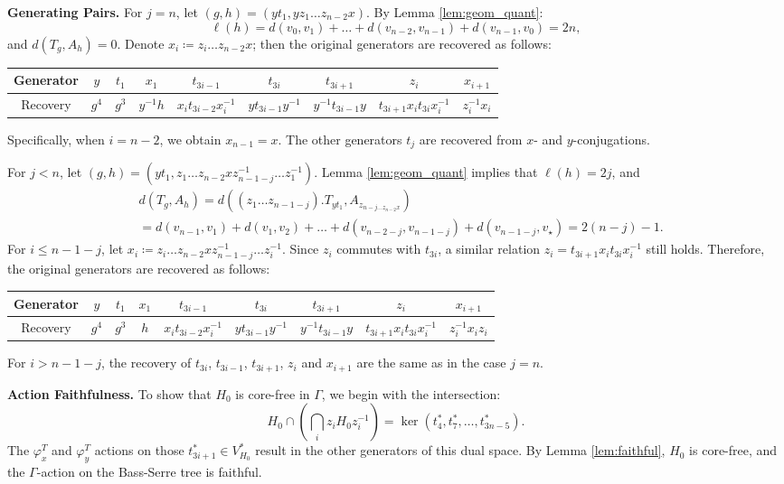 \documentclass[12pt,leqno]{amsart}
\makeatletter
\renewenvironment{proof}[1][\proofname]{%
	\par
	\pushQED{\qed}%
	\normalfont
	\topsep6\p@\@plus6\p@\relax
	\trivlist
	\item[\hskip\labelsep\itshape #1\@addpunct{.}]%
	\ignorespaces
}{%
	\par\nobreak\vspace{2pt}%
	\popQED%
	\medskip%
	\endtrivlist
	\@endpefalse
}
\newcommand{\2}{L^2_{\rm per}(0, T)}
\numberwithin{equation}{section}
\numberwithin{figure}{section}
\makeatother
\begin{document}
\begin{proof}
    \textbf{Generating Pairs.} For $j=n$, let $(g,h) = (yt_1,yz_1\dots z_{n-2}x)$. By Lemma \ref{lem:geom_quant}:
    \[
    \ell(h) = d(v_0,v_1) + \dots + d(v_{n-2},v_{n-1}) + d(v_{n-1}, v_0) = 2n,
    \]
    and $d(T_g,A_h) = 0$. Denote $x_i\coloneqq z_i\dots z_{n-2}x$; then the original generators are recovered as follows:
    \begin{center}
        \begin{tabular}{c||c|c|c|c|c|c|c|c}
            Generator & $y$ & $t_1$ & $x_1$ & $t_{3i-1}$ & $t_{3i}$ & $t_{3i+1}$ & $z_i$ & $x_{i+1}$ \\
            \hline
            Recovery & $g^4$ & $g^3$ & $y^{-1}h$ & $x_it_{3i-2}x_i^{-1}$ & $yt_{3i-1}y^{-1}$ & $y^{-1}t_{3i-1}y$ & $t_{3i+1}x_it_{3i}x_i^{-1}$ & $z_i^{-1}x_i$
        \end{tabular}
    \end{center}
    Specifically, when $i=n-2$, we obtain $x_{n-1} = x$. The other generators $t_j$ are recovered from $x$- and $y$-conjugations.

    For $j<n$, let $(g,h) = (yt_1, z_1\dots z_{n-2}xz_{n-1-j}^{-1}\dots z_1^{-1})$. Lemma \ref{lem:geom_quant} implies that $\ell(h) = 2j$, and
    \[
        \begin{split}
            & d(T_g,A_h) = d((z_1\dots z_{n-1-j}).T_{yt_1},A_{z_{n-j\dots z_{n-2}x}}) \\
            & = d(v_{n-1},v_1) + d(v_1,v_2) + \dots + d(v_{n-2-j}, v_{n-1-j}) + d(v_{n-1-j}, v_\star) = 2(n-j) - 1.
        \end{split}
    \]
    For $i\leq n-1-j$, let $x_i\coloneqq z_i\dots z_{n-2}xz_{n-1-j}^{-1}\dots z_i^{-1}$. Since $z_i$ commutes with $t_{3i}$, a similar relation $z_i = t_{3i+1}x_i t_{3i}x_i^{-1}$ still holds. Therefore, the original generators are recovered as follows:
    \begin{center}
        \begin{tabular}{c||c|c|c|c|c|c|c|c}
            Generator & $y$ & $t_1$ & $x_1$ & $t_{3i-1}$ & $t_{3i}$ & $t_{3i+1}$ & $z_i$ & $x_{i+1}$ \\
            \hline
            Recovery & $g^4$ & $g^3$ & $h$ & $x_it_{3i-2}x_i^{-1}$ & $yt_{3i-1}y^{-1}$ & $y^{-1}t_{3i-1}y$ & $t_{3i+1}x_it_{3i}x_i^{-1}$ & $z_i^{-1}x_iz_i$
        \end{tabular}
    \end{center}
    For $i>n-1-j$, the recovery of $t_{3i}$, $t_{3i-1}$, $t_{3i+1}$, $z_i$ and $x_{i+1}$ are the same as in the case $j=n$. 

    \textbf{Action Faithfulness.} To show that $H_0$ is core-free in $\Gamma$, we begin with the intersection:
    \[
    H_0\cap \left(\bigcap_i z_iH_0z_i^{-1}\right) = \ker(t_{4}^*,t_{7}^*,\dots, t_{3n-5}^*).
    \]
    The $\varphi_x^T$ and $\varphi_y^T$ actions on those $t_{3i+1}^*\in V_{H_0}^*$ result in the other generators of this dual space. By Lemma \ref{lem:faithful}, $H_0$ is core-free, and the $\Gamma$-action on the Bass-Serre tree is faithful.
\end{proof}
\end{document}

